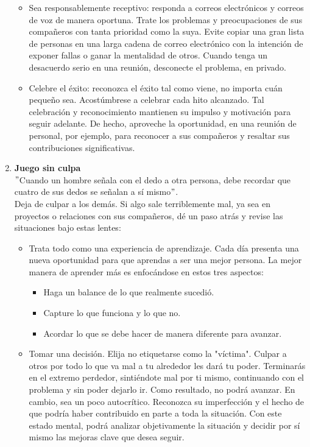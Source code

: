 \documentclass[10pt]{book}
\begin{document}
\begin{enumerate}[\bfseries 1.]
\begin{itemize}
\item Sea responsablemente receptivo: responda a correos electrónicos y correos de voz de manera oportuna. Trate los problemas y preocupaciones de sus compañeros con tanta prioridad como la suya. Evite copiar una gran lista de personas en una larga cadena de correo electrónico con la intención de exponer fallas o ganar la mentalidad de otros. Cuando tenga un desacuerdo serio en una reunión, desconecte el problema, en privado.
\item Celebre el éxito: reconozca el éxito tal como viene, no importa cuán pequeño sea. Acostúmbrese a celebrar cada hito alcanzado. Tal celebración y reconocimiento mantienen su impulso y motivación para seguir adelante. De hecho, aproveche la oportunidad, en una reunión de personal, por ejemplo, para reconocer a sus compañeros y resaltar sus contribuciones significativas.
\end{itemize}
\item \textbf{Juego sin culpa}\\
$"$Cuando un hombre señala con el dedo a otra persona, debe recordar que cuatro de sus dedos se señalan a sí mismo$"$.\\
Deja de culpar a los demás. Si algo sale terriblemente mal, ya sea en proyectos o relaciones con sus compañeros, dé un paso atrás y revise las situaciones bajo estas lentes:
\begin{itemize}
\item Trata todo como una experiencia de aprendizaje. Cada día presenta una nueva oportunidad para que aprendas a ser una mejor persona. La mejor manera de aprender más es enfocándose en estos tres aspectos:
\begin{itemize}
\item Haga un balance de lo que realmente sucedió.
\item Capture lo que funciona y lo que no.
\item Acordar lo que se debe hacer de manera diferente para avanzar.
\end{itemize}
\item Tomar una decisión. Elija no etiquetarse como la "víctima". Culpar a otros por todo lo que va mal a tu alrededor les dará tu poder. Terminarás en el extremo perdedor, sintiéndote mal por ti mismo, continuando con el problema y sin poder dejarlo ir. Como resultado, no podrá avanzar. En cambio, sea un poco autocrítico. Reconozca su imperfección y el hecho de que podría haber contribuido en parte a toda la situación. Con este estado mental, podrá analizar objetivamente la situación y decidir por sí mismo las mejoras clave que desea seguir.

\end{itemize}
\end{enumerate}
\end{document}

